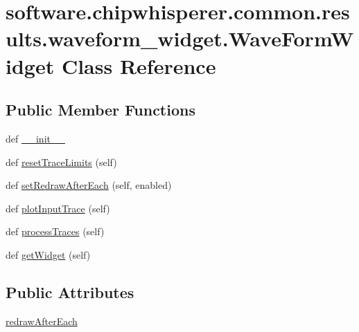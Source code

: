 \hypertarget{classsoftware_1_1chipwhisperer_1_1common_1_1results_1_1waveform__widget_1_1WaveFormWidget}{}\section{software.\+chipwhisperer.\+common.\+results.\+waveform\+\_\+widget.\+Wave\+Form\+Widget Class Reference}
\label{classsoftware_1_1chipwhisperer_1_1common_1_1results_1_1waveform__widget_1_1WaveFormWidget}
\subsection*{Public Member Functions}
\begin{DoxyCompactItemize}
\item 
def \hyperlink{classsoftware_1_1chipwhisperer_1_1common_1_1results_1_1waveform__widget_1_1WaveFormWidget_aaca9b6d34808f541cdeaff2a0db1f5fc}{\+\_\+\+\_\+init\+\_\+\+\_\+}
\item 
def \hyperlink{classsoftware_1_1chipwhisperer_1_1common_1_1results_1_1waveform__widget_1_1WaveFormWidget_a5d0b52d0e854e36ced61f90547daef63}{reset\+Trace\+Limits} (self)
\item 
def \hyperlink{classsoftware_1_1chipwhisperer_1_1common_1_1results_1_1waveform__widget_1_1WaveFormWidget_a30d46f17faf50a747d563441d90d0a6c}{set\+Redraw\+After\+Each} (self, enabled)
\item 
def \hyperlink{classsoftware_1_1chipwhisperer_1_1common_1_1results_1_1waveform__widget_1_1WaveFormWidget_ad647aa0ea34bda73fec2c2e1695720d8}{plot\+Input\+Trace} (self)
\item 
def \hyperlink{classsoftware_1_1chipwhisperer_1_1common_1_1results_1_1waveform__widget_1_1WaveFormWidget_a6d52aa963daf9e87debee36510266a24}{process\+Traces} (self)
\item 
def \hyperlink{classsoftware_1_1chipwhisperer_1_1common_1_1results_1_1waveform__widget_1_1WaveFormWidget_a750089233c3ca4406b423172777c7aa0}{get\+Widget} (self)
\end{DoxyCompactItemize}
\subsection*{Public Attributes}
\begin{DoxyCompactItemize}
\item 
\hyperlink{classsoftware_1_1chipwhisperer_1_1common_1_1results_1_1waveform__widget_1_1WaveFormWidget_a1ab3d2b50abef54a20f88960c8cc1a10}{redraw\+After\+Each}
\end{DoxyCompactItemize}


